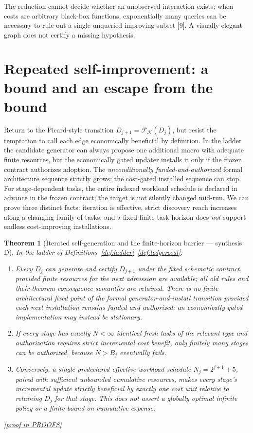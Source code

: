 \documentclass[11pt,letterpaper]{article}
\newtheorem{theorem}{Theorem}[section]
\theoremstyle{definition}
\theoremstyle{remark}
\newcommand{\K}{\mathcal K}
\newcommand{\F}{\mathcal F}
\newcommand{\prooflink}[1]{\hfill\hyperlink{proof:#1}{\footnotesize[proof in PROOFS]}}
\newcommand{\src}[1]{\textup{[#1]}}
\begin{document}
The reduction cannot decide whether an unobserved interaction exists; when costs are arbitrary black-box functions, exponentially many queries can be necessary to rule out a single unqueried improving subset \src{9}. A visually elegant graph does not certify a missing hypothesis.

\section{Repeated self-improvement: a bound and an escape from the bound}\label{sec:iteration}
Return to the Picard-style transition $D_{j+1}=\F_{\K}(D_j)$, but resist the temptation to call each edge economically beneficial by definition. In the ladder the candidate generator can always propose one additional macro with adequate finite resources, but the economically gated updater installs it only if the frozen contract authorizes adoption. The \emph{unconditionally funded-and-authorized} formal architecture sequence strictly grows; the cost-gated installed sequence can stop. For stage-dependent tasks, the entire indexed workload schedule is declared in advance in the frozen contract; the target is not silently changed mid-run. We can prove three distinct facts: iteration is effective, strict discovery reach increases along a changing family of tasks, and a fixed finite task horizon does \emph{not} support endless cost-improving installations.

\begin{theorem}[Iterated self-generation and the finite-horizon barrier --- synthesis D]\label{thm:iteration}\hypertarget{claim:iteration}{}
In the ladder of Definitions~\ref{def:ladder}--\ref{def:ledgercost}:
\begin{enumerate}[label=(\roman*),leftmargin=2em]
\item Every $D_j$ can generate and certify $D_{j+1}$ under the fixed \emph{schematic} contract, provided finite resources for the next admission are available; all old rules and their theorem-consequence semantics are retained. There is no finite \emph{architectural} fixed point of the formal generator-and-install transition \emph{provided each next installation remains funded and authorized}; an economically gated implementation may instead be stationary.
\item If every stage has exactly $N<\infty$ identical fresh tasks of the relevant type and authorization requires strict \emph{incremental} cost benefit, only finitely many stages can be authorized, because $N>B_j$ eventually fails.
\item Conversely, a single predeclared effective workload schedule $N_j=2^{j+1}+5$, paired with sufficient unbounded cumulative resources, makes every stage's \emph{incremental} update strictly beneficial by exactly one cost unit relative to retaining $D_j$ for that stage. This does not assert a globally optimal infinite policy or a finite bound on cumulative expense.
\end{enumerate}
\prooflink{iteration}
\end{theorem}
\end{document}
